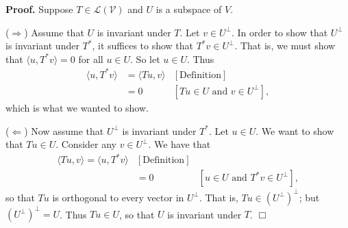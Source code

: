 \documentclass[9pt]{article}
\newcommand{\qed}{\hfill \ensuremath{\Box}}
\newcommand{\cyc}[1]{\langle #1 \rangle}
\begin{document}
\begin{enumerate}
      \textbf{Proof.} Suppose $T \in \mathcal{L(V)}$ and $U$ is a subspace of
      $V$. 
      
      ($\Rightarrow$) Assume that $U$ is invariant under $T$. Let
      $v \in U^\perp$. In order to show that $U^\perp$ is invariant under
      $T^*$, it suffices to show that $T^*v \in U^\perp$. That is, we must show
      that $\cyc{u, T^*v} = 0$ for all $u \in U$. So let $u \in U$. Thus
      \begin{align*}
         \cyc{u, T^*v} &= \cyc{Tu, v} &[\text{Definition}] \\
          &= 0 &[Tu \in U \text{ and } v \in U^\perp],
      \end{align*}
      which is what we wanted to show.
      
      ($\Leftarrow$) Now assume that $U^\perp$ is invariant under $T^*$. Let
      $u \in U$. We want to show that $Tu \in U$. Consider any $v \in U^\perp$.
      We have that
      \begin{align*}
         \cyc{Tu, v} = \cyc{u, T^*v} &[\text{Definition}] \\
          &= 0 &[u \in U \text{ and } T^*v \in U^\perp],
      \end{align*}
      so that $Tu$ is orthogonal to every vector in $U^\perp$. That is,
      $Tu \in (U^\perp)^\perp$; but $(U^\perp)^\perp = U$. Thus $Tu \in U$, so
      that $U$ is invariant under $T$. \qed
      
\end{enumerate}
\end{document}
